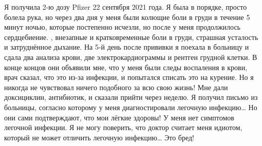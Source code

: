 Я получила 2-ю дозу Pfizer 22 сентября 2021 года. Я была в порядке, просто
болела рука, но через два дня у меня были колющие боли в груди в течение 5 минут
ночью, которые постепенно исчезли, но после у меня продолжилось сердцебиение. ,
внезапные и кратковременные боли в груди, страшная усталость и затруднённое
дыхание. На 5-й день после прививки я поехала в больницу и сдала два анализа
крови, две электрокардиограммы и рентген грудной клетки. В конце концов они
объявили мне, что у меня были следы воспаления в крови, врач сказал, что это
из-за инфекции, и попытался списать это на курение. Но я никогда не чувствовал
ничего подобного за всю свою жизнь! Мне дали доксициклин, антибиотик, и сказали
прийти через неделю. Я получил письмо из больницы, согласно которому у меня
диагностировали легочную инфекцию… Но они сами подтверждают, что мои лёгкие
здоровы! У меня нет симптомов легочной инфекции. Я не могу поверить, что доктор
считает меня идиотом, который не может отличить легочную инфекцию… Это бред!
